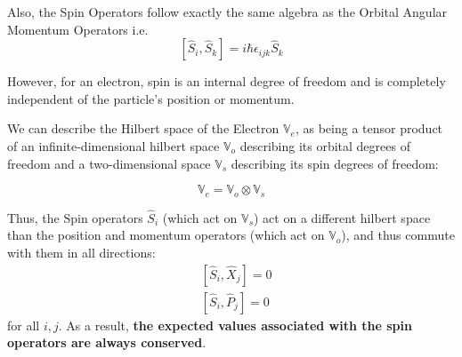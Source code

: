 \documentclass{article}
\begin{document}
Also, the Spin Operators follow exactly the same algebra as the Orbital Angular Momentum Operators i.e.
\[ [\hat{S}_i, \hat{S}_k] = i\hbar \epsilon_{ijk} \hat{S}_k \]

However, for an electron, spin is an internal degree of freedom and is completely independent of the particle's position or momentum. 

\vskip 0.5cm 
We can describe the Hilbert space of the Electron $\mathbb{V}_e$, as being a tensor product of an infinite-dimensional hilbert space $\mathbb{V}_o$ describing its orbital degrees of freedom and a two-dimensional space $\mathbb{V}_s$ describing its spin degrees of freedom:

\[ \mathbb{V}_e = \mathbb{V}_o \otimes \mathbb{V}_s \]

Thus, the Spin operators $\hat{S}_i$ (which act on $\mathbb{V}_s$) act on a different hilbert space than the position and momentum operators (which act on $\mathbb{V}_o$), and thus commute with them in all directions:
\begin{align*}
  & \boxed{[\hat{S}_i, \hat{X}_j] = 0} \\
  & \boxed{[\hat{S}_i, \hat{P}_j] = 0} 
\end{align*}
for all $i, j$. As a result, \textbf{the expected values associated with the spin operators are always conserved}.
\end{document}
